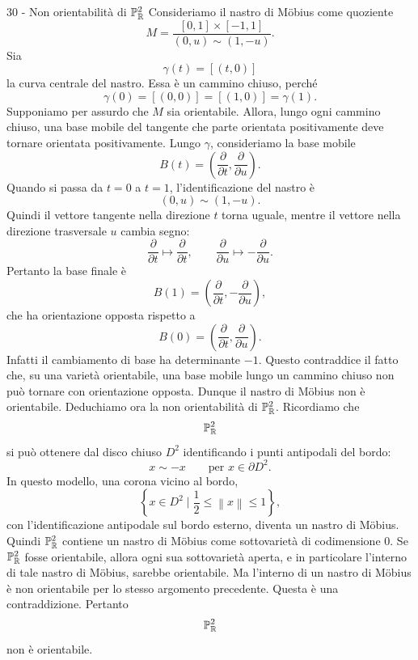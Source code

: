 \documentclass[a4paper]{article}
\begin{document}
\begin{snippetsolution}{30 - Non orientabilità di \(\mathbb{P}^2_{\mathbb{R}}\)}
    Consideriamo il nastro di Möbius come quoziente
    \[
        M=\frac{[0,1]\times[-1,1]}{(0,u)\sim(1,-u)}.
    \]
    Sia
    \[
        \gamma(t)=[(t,0)]
    \]
    la curva centrale del nastro. Essa è un cammino chiuso, perché
    \[
        \gamma(0)=[(0,0)]=[(1,0)]=\gamma(1).
    \]
    Supponiamo per assurdo che \(M\) sia orientabile. Allora, lungo ogni cammino chiuso, una base mobile del tangente che parte orientata positivamente deve tornare orientata positivamente.
    Lungo \(\gamma\), consideriamo la base mobile
    \[
        B(t)=\left(\frac{\partial}{\partial t},\frac{\partial}{\partial u}\right).
    \]
    Quando si passa da \(t=0\) a \(t=1\), l'identificazione del nastro è
    \[
        (0,u)\sim(1,-u).
    \]
    Quindi il vettore tangente nella direzione \(t\) torna uguale, mentre il vettore nella direzione trasversale \(u\) cambia segno:
    \[
        \frac{\partial}{\partial t}\longmapsto \frac{\partial}{\partial t},
        \qquad
        \frac{\partial}{\partial u}\longmapsto -\frac{\partial}{\partial u}.
    \]
    Pertanto la base finale è
    \[
        B(1)=\left(\frac{\partial}{\partial t},-\frac{\partial}{\partial u}\right),
    \]
    che ha orientazione opposta rispetto a
    \[
        B(0)=\left(\frac{\partial}{\partial t},\frac{\partial}{\partial u}\right).
    \]
    Infatti il cambiamento di base ha determinante \(-1\). Questo contraddice il fatto che, su una varietà orientabile, una base mobile lungo un cammino chiuso non può tornare con orientazione opposta. Dunque il nastro di Möbius non è orientabile.
    Deduchiamo ora la non orientabilità di \(\mathbb{P}^2_{\mathbb{R}}\). Ricordiamo che
    \[
        \mathbb{P}^2_{\mathbb{R}}
    \]
    si può ottenere dal disco chiuso \(D^2\) identificando i punti antipodali del bordo:
    \[
        x\sim -x
        \qquad
        \text{per }x\in\partial D^2.
    \]
    In questo modello, una corona vicino al bordo,
    \[
        \left\{x\in D^2\mid \frac12\leq \left\|x\right\|\leq 1\right\},
    \]
    con l'identificazione antipodale sul bordo esterno, diventa un nastro di Möbius. Quindi \(\mathbb{P}^2_{\mathbb{R}}\) contiene un nastro di Möbius come sottovarietà di codimensione \(0\).
    Se \(\mathbb{P}^2_{\mathbb{R}}\) fosse orientabile, allora ogni sua sottovarietà aperta, e in particolare l'interno di tale nastro di Möbius, sarebbe orientabile. Ma l'interno di un nastro di Möbius è non orientabile per lo stesso argomento precedente. Questa è una contraddizione.
    Pertanto
    \[
        \mathbb{P}^2_{\mathbb{R}}
    \]
    non è orientabile.
\end{snippetsolution}
\end{document}
